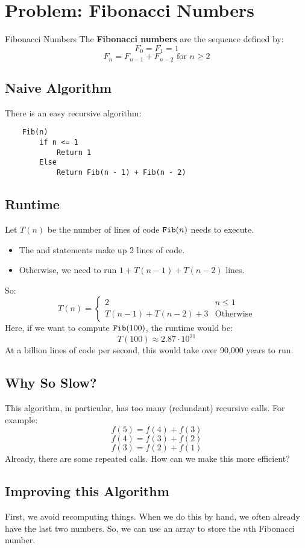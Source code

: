 \documentclass[letterpaper]{article}
\begin{document}
\section{Problem: Fibonacci Numbers}
\begin{definition}{Fibonacci Numbers}{}
    The \textbf{Fibonacci numbers} are the sequence defined by: 
    \[F_0 = F_1 = 1\]
    \[F_n = F_{n - 1} + F_{n - 2} \text{ for } n \geq 2\]
\end{definition}

\subsection{Naive Algorithm}
There is an easy recursive algorithm:
\begin{verbatim}
    Fib(n)
        if n <= 1
            Return 1
        Else 
            Return Fib(n - 1) + Fib(n - 2)
\end{verbatim}

\subsection{Runtime}
Let $T(n)$ be the number of lines of code $\texttt{Fib}(n)$ needs to execute.
\begin{itemize}
    \item The  and  statements make up 2 lines of code. 
    \item Otherwise, we need to run $1 + T(n - 1) + T(n - 2)$ lines.
\end{itemize}
So: 
\[T(n) = \begin{cases}
    2 & n \leq 1 \\ 
    T(n - 1) + T(n - 2) + 3 & \text{Otherwise}
\end{cases}\]
Here, if we want to compute $\texttt{Fib}(100)$, the runtime would be: 
\[T(100) \approx 2.87 \cdot 10^{21}\]
At a billion lines of code per second, this would take over 90,000 years to run. 

\subsection{Why So Slow?}
This algorithm, in particular, has too many (redundant) recursive calls. For example:
\[f(5) = f(4) + f(3)\]
\[f(4) = f(3) + f(2)\]
\[f(3) = f(2) + f(1)\]
Already, there are some repeated calls. How can we make this more efficient? 

\subsection{Improving this Algorithm}
First, we avoid recomputing things. When we do this by hand, we often already have the last two numbers. So, we can use an array to store the $n$th Fibonacci number. 
\end{document}
